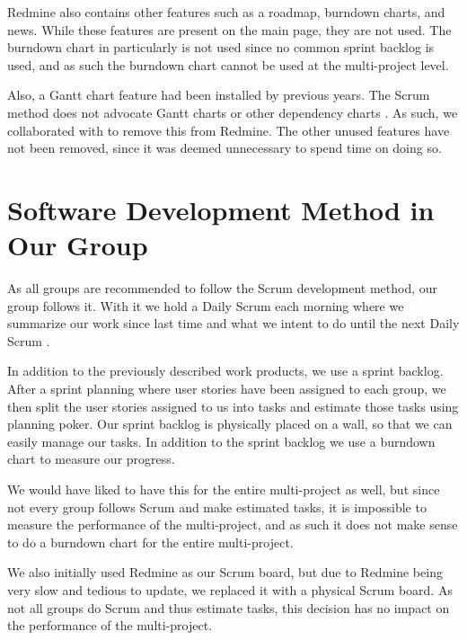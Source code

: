 Redmine also contains other features such as a roadmap, burndown charts, and news. While these features are present on the main page, they are not used. The burndown chart in particularly is not used since no common sprint backlog is used, and as such the burndown chart cannot be used at the multi-project level.

Also, a Gantt chart feature had been installed by previous years. The Scrum method does not advocate Gantt charts or other dependency charts \parencite{larman2003}. As such, we collaborated with  to remove this from Redmine. The other unused features have not been removed, since it was deemed unnecessary to spend time on doing so. 

\section{Software Development Method in Our Group}\label{sec:swmethod_ourgroup}
As all groups are recommended to follow the Scrum development method, our group follows it. With it we hold a Daily Scrum each morning where we summarize our work since last time and what we intent to do until the next Daily Scrum .

In addition to the previously described work products, we use a sprint backlog. After a sprint planning where user stories have been assigned to each group, we then split the user stories assigned to us into tasks and estimate those tasks using planning poker. Our sprint backlog is physically placed on a wall, so that we can easily manage our tasks. In addition to the sprint backlog we use a burndown chart to measure our progress.

We would have liked to have this for the entire multi-project as well, but since not every group follows Scrum and make estimated tasks, it is impossible to measure the performance of the multi-project, and as such it does not make sense to do a burndown chart for the entire multi-project. 

We also initially used Redmine as our Scrum board, but due to Redmine being very slow and tedious to update, we replaced it with a physical Scrum board. As not all groups do Scrum and thus estimate tasks, this decision has no impact on the performance of the multi-project. 

